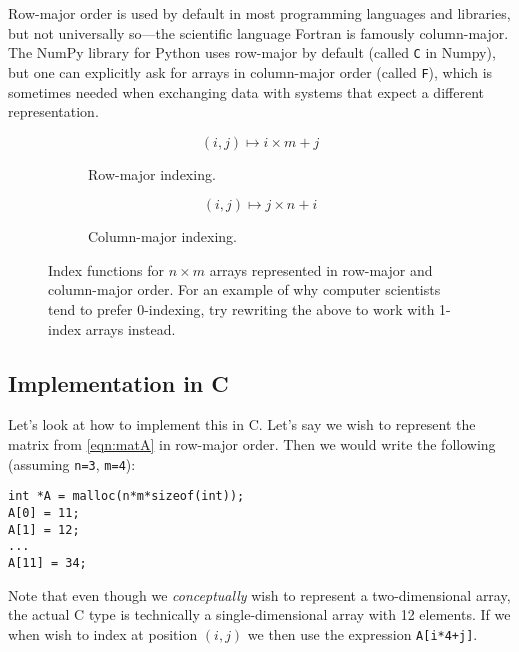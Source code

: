 Row-major order is used by default in most programming languages and
libraries, but not universally so---the scientific language Fortran is
famously column-major.  The NumPy library for Python uses row-major by
default (called \texttt{C} in Numpy), but one can explicitly ask for
arrays in column-major order (called \texttt{F}), which is sometimes
needed when exchanging data with systems that expect a different
representation.

\begin{figure*}
  \centering

  \begin{subfigure}[b]{0.45\textwidth}
    \begin{equation}
      (i,j) \mapsto i\times m + j \label{eqn:idx2row}
    \end{equation}
    \caption{Row-major indexing.}
    \label{fig:rowmajor}
  \end{subfigure}
  \hfill
  \begin{subfigure}[b]{0.45\textwidth}
    \begin{equation}
      (i,j) \mapsto j\times n + i \label{eqn:idx2col}
    \end{equation}
    \caption{Column-major indexing.}
    \label{fig:colmajor}
  \end{subfigure}

  \caption{Index functions for $n\times{}m$ arrays represented in
    row-major and column-major order.  For an example of why computer
    scientists tend to prefer 0-indexing, try rewriting the above to
    work with 1-index arrays instead.}
  \label{fig:indexfunctions}
\end{figure*}

\subsection{Implementation in C}

Let's look at how to implement this in C.  Let's say we wish to
represent the matrix from \cref{eqn:matA} in row-major order.  Then we
would write the following (assuming \texttt{n=3}, \texttt{m=4}):

\begin{lstlisting}
int *A = malloc(n*m*sizeof(int));
A[0] = 11;
A[1] = 12;
...
A[11] = 34;
\end{lstlisting}

Note that even though we \textit{conceptually} wish to represent a
two-dimensional array, the actual C type is technically a
single-dimensional array with 12 elements.  If we when wish to index
at position $(i,j)$ we then use the expression \lstinline{A[i*4+j]}.

